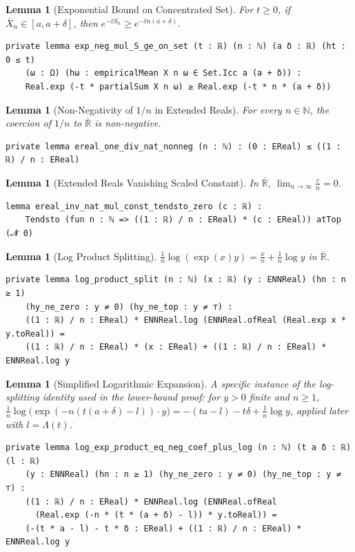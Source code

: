 \documentclass{article}
\newtheorem{lemma}[theorem]{Lemma}
\newcommand{\R}{\mathbb{R}}
\newcommand{\N}{\mathbb{N}}
\begin{document}
\begin{lemma}[Exponential Bound on Concentrated Set]
  For $t \ge 0$, if $\overline{X}_n \in [a, a+\delta]$, then $e^{-t S_n} \ge e^{-tn(a+\delta)}$.
\end{lemma}
\begin{lstlisting}[caption={LargeDeviations/Cramers/LowerBound.lean}]
private lemma exp_neg_mul_S_ge_on_set (t : ℝ) (n : ℕ) (a δ : ℝ) (ht : 0 ≤ t)
    (ω : Ω) (hω : empiricalMean X n ω ∈ Set.Icc a (a + δ)) :
    Real.exp (-t * partialSum X n ω) ≥ Real.exp (-t * n * (a + δ))
\end{lstlisting}
\begin{lemma}[Non-Negativity of $1/n$ in Extended Reals]
  For every $n \in \N$, the coercion of $1/n$ to $\overline{\R}$ is non-negative.
\end{lemma}
\begin{lstlisting}
private lemma ereal_one_div_nat_nonneg (n : ℕ) : (0 : EReal) ≤ ((1 : ℝ) / n : EReal)
\end{lstlisting}
\begin{lemma}[Extended Reals Vanishing Scaled Constant]
  In $\overline{\R}$, $\lim_{n\to\infty} \frac{c}{n} = 0$.
\end{lemma}
\begin{lstlisting}
lemma ereal_inv_nat_mul_const_tendsto_zero (c : ℝ) :
    Tendsto (fun n : ℕ => ((1 : ℝ) / n : EReal) * (c : EReal)) atTop (𝓝 0)
\end{lstlisting}
\begin{lemma}[Log Product Splitting]
  $\frac{1}{n}\log(\exp(x)y) = \frac{x}{n} + \frac{1}{n}\log y$ in $\overline{\R}$.
\end{lemma}
\begin{lstlisting}
private lemma log_product_split (n : ℕ) (x : ℝ) (y : ENNReal) (hn : n ≥ 1)
    (hy_ne_zero : y ≠ 0) (hy_ne_top : y ≠ ⊤) :
    ((1 : ℝ) / n : EReal) * ENNReal.log (ENNReal.ofReal (Real.exp x * y.toReal)) =
    ((1 : ℝ) / n : EReal) * (x : EReal) + ((1 : ℝ) / n : EReal) * ENNReal.log y
\end{lstlisting}
\newpage
\begin{lemma}[Simplified Logarithmic Expansion]
  A specific instance of the log-splitting identity used in the lower-bound proof: for $y > 0$ finite and $n \ge 1$, $\frac{1}{n} \log\bigl(\exp(-n(t(a+\delta) - l)) \cdot y\bigr) = -(ta - l) - t\delta + \frac{1}{n} \log y$, applied later with $l = \Lambda(t)$.
\end{lemma}
\begin{lstlisting}
private lemma log_exp_product_eq_neg_coef_plus_log (n : ℕ) (t a δ : ℝ) (l : ℝ)
    (y : ENNReal) (hn : n ≥ 1) (hy_ne_zero : y ≠ 0) (hy_ne_top : y ≠ ⊤) :
    ((1 : ℝ) / n : EReal) * ENNReal.log (ENNReal.ofReal
      (Real.exp (-n * (t * (a + δ) - l)) * y.toReal)) =
    (-(t * a - l) - t * δ : EReal) + ((1 : ℝ) / n : EReal) * ENNReal.log y
\end{lstlisting}
\end{document}
